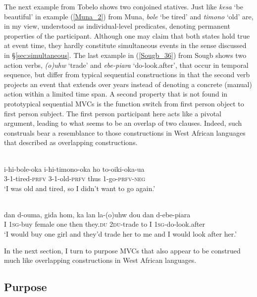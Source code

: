 The next example from Tobelo shows two conjoined statives. Just like \textit{kesa} `be beautiful' in example (\ref{Muna_2}) from Muna, \textit{bole} `be tired' and \textit{timono} `old' are, in my view, understood as individual-level predicates, denoting permanent properties of the participant. Although one may claim that both states hold true at event time, they hardly constitute simultaneous events in the sense discussed in §\ref{sec:simultaneous}. The last example in (\ref{Sougb_36}) from Sougb shows two action verbs, \textit{(o)uhw} `trade' and \textit{ebe-piara} `do-look.after', that occur in temporal sequence, but differ from typical sequential constructions in that the second verb projects an event that extends over years instead of denoting a concrete (manual) action within a limited time span. A second property that is not found in prototypical sequential MVCs is the function switch from first person object to first person subject. The first person participant here acts like a pivotal argument, leading to what seems to be an overlap of two clauses. Indeed, such construals bear a resemblance to those constructions in West African languages that \citet{ameka2005multiverb} described as overlapping constructions.

\ea \label{}
\\
\gll i-hi-bole-oka i-hi-timono-oka ho to-oiki-oka-ua \\
3-1-tired-\textsc{prfv} 3-1-old-\textsc{prfv} thus 1-go-\textsc{prfv}-\textsc{neg} \\
\glft `I was old and tired, so I didn't want to go again.'\\ 
\z

\ea \label{Sougb_36}
\\
\gll dan d-ouma, gida hom, ka lan la-(o)uhw dou dan d-ebe-piara \\
I 1\textsc{sg}-buy female one then they.\textsc{du} 2\textsc{du}-trade to I 1\textsc{sg}-do-look.after \\
\glft `I would buy one girl and they'd trade her to me and I would look after her.'\\ 
\z

In the next section, I turn to purpose MVCs that also appear to be construed much like overlapping constructions in West African languages.

\subsection{Purpose} \label{sec:purpose}

